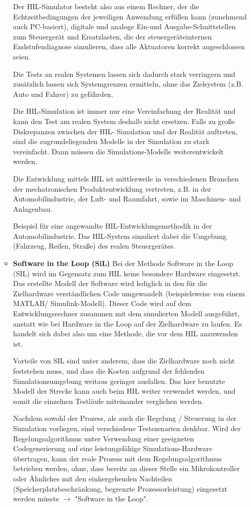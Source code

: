 \documentclass[10pt,a4paper,fleqn]{article}
\begin{document}
\begin{enumerate}
\begin{itemize}
				Der HIL-Simulator besteht also aus einem Rechner, der die Echtzeitbedingungen der jeweiligen Anwendung erfüllen kann (zunehmend auch PC-basiert), digitale und analoge Ein-und Ausgabe-Schnittstellen zum Steuergerät und Ersatzlasten, die der steuergeräteinternen Endstufendiagnose simulieren, dass alle Aktuatoren korrekt angeschlossen seien.
				
				Die Tests an realen Systemen lassen sich dadurch stark verringern und zusätzlich lassen sich Systemgrenzen ermitteln, ohne das Zielsystem (z.B. Auto und Fahrer) zu gefährden.
				
				Die HIL-Simulation ist immer nur eine Vereinfachung der Realität und kann den Test am realen System deshalb nicht ersetzen. Falls zu große Diskrepanzen zwischen der HIL- Simulation und der Realität auftreten, sind die zugrundeliegenden Modelle in der Simulation zu stark vereinfacht. Dann müssen die Simulations-Modelle weiterentwickelt werden.
				
				Die Entwicklung mittels HIL ist mittlerweile in verschiedenen Branchen der mechatronischen Produktentwicklung vertreten, z.B. in der Automobilindustrie, der Luft- und Raumfahrt, sowie im Maschinen- und Anlagenbau.
				
				Beispiel für eine angewandte HIL-Entwicklungsmethodik in der Automobilindustrie. Das HIL-System simuliert dabei die Umgebung (Fahrzeug, Reifen, Straße) des realen Steuergerätes.
			
			\item \textbf{Software in the Loop (SiL)}
				Bei der Methode Software in the Loop (SIL) wird im Gegensatz zum HIL keine besondere Hardware eingesetzt. Das erstellte Modell der Software wird lediglich in den für die Zielhardware verständlichen Code umgewandelt (beispielsweise von einem MATLAB/ Simulink-Modell). Dieser Code wird auf dem Entwicklungsrechner zusammen mit dem simulierten Modell ausgeführt, anstatt wie bei Hardware in the Loop auf der Zielhardware zu laufen. Es handelt sich dabei also um eine Methode, die vor dem HIL anzuwenden ist.
				
				Vorteile von SIL sind unter anderem, dass die Zielhardware noch nicht feststehen muss, und dass die Kosten aufgrund der fehlenden Simulationsumgebung weitaus geringer ausfallen. Das hier benutzte Modell der Strecke kann auch beim HIL weiter verwendet werden, und somit die einzelnen Testläufe miteinander verglichen werden.
				
				Nachdem sowohl der Prozess, als auch die Regelung / Steuerung in der Simulation vorliegen, sind verschiedene Testszenarien denkbar. Wird der Regelungsalgorithmus unter Verwendung einer geeigneten Codegenerierung auf eine leistungsfähige Simulations-Hardware übertragen, kann der reale Prozess mit dem Regelungsalgorithmus betrieben werden, ohne, dass bereits an dieser Stelle ein Mikrokontroller oder Ähnliches mit den einhergehenden Nachteilen (Speicherplatzbeschränkung, begrenzte Prozessorleistung) eingesetzt werden müsste $\rightarrow$ "Software in the Loop".
		\end{itemize}

\end{enumerate}
\end{document}
